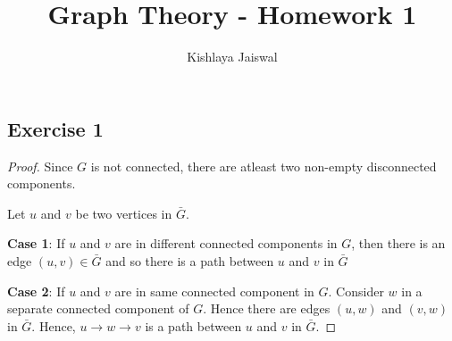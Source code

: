 \documentclass[12pt]{article}
\title{Graph Theory - Homework 1}
\author{Kishlaya Jaiswal}
\begin{document}
\maketitle

\vspace{0.5in}


\subsection*{Exercise 1}
\begin{proof}
Since $G$ is not connected, there are atleast two non-empty disconnected components.

Let $u$ and $v$ be two vertices in $\bar{G}$. 

\textbf{Case 1}: If $u$ and $v$ are in different connected components in $G$, then there is an edge $(u,v) \in \bar{G}$ and so there is a path between $u$ and $v$ in $\bar{G}$

\textbf{Case 2}: If $u$ and $v$ are in same connected component in $G$. Consider $w$ in a separate connected component of $G$. Hence there are edges $(u,w)$ and $(v,w)$ in $\bar{G}$. Hence, $u \rightarrow w \rightarrow v$ is a path between $u$ and $v$ in $\bar{G}$.
\end{proof}

\newpage
\end{document}
